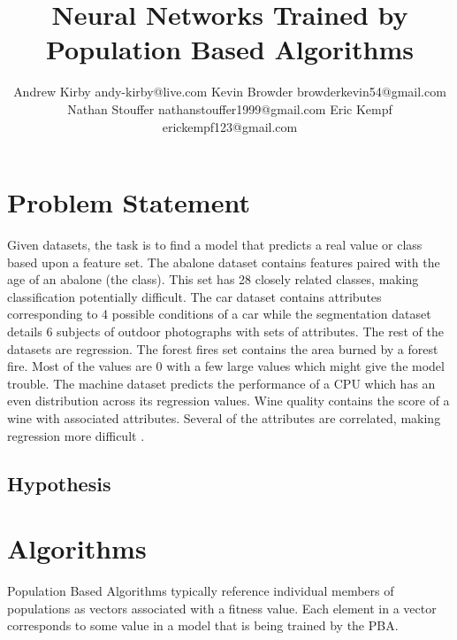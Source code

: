 \documentclass[twoside,11pt]{article}
\begin{document}
\title{Neural Networks Trained by Population Based Algorithms}

\author{\name Andrew Kirby \email andy-kirby@live.com \AND
		\name Kevin Browder \email browderkevin54@gmail.com \AND
		\name Nathan Stouffer \email nathanstouffer1999@gmail.com \AND
		\name Eric Kempf \email erickempf123@gmail.com }

\maketitle

\begin{abstract}

\end{abstract}


\section{Problem Statement}
	Given datasets, the task is to find a model that predicts a real value or class based upon a feature set. The abalone dataset contains features paired with the age of an abalone (the class). This set has 28 closely related classes, making classification potentially difficult.
	The car dataset contains attributes corresponding to 4 possible conditions of a car while the segmentation dataset details 6 subjects of outdoor photographs with sets of attributes.
	The rest of the datasets are regression.
	The forest fires set contains the area burned by a forest fire. Most of the values are 0 with a few large values which might give the model trouble.
	The machine dataset predicts the performance of a CPU which has an even distribution across its regression values. Wine quality contains the score of a wine with associated attributes. Several of the attributes are correlated, making regression more difficult \citep{datasets}.

\subsection{Hypothesis}

\section{Algorithms}

	Population Based Algorithms typically reference individual members of populations as vectors associated with a fitness value. Each element in a vector corresponds to some value in a model that is being trained by the PBA.
	
\end{document}
